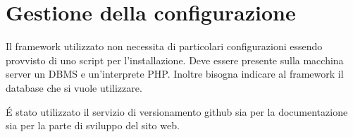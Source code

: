 \documentclass[a4paper,12pt,hidelinks]{report}
\begin{document}
\section{Gestione della configurazione}
Il framework utilizzato non necessita di particolari configurazioni essendo provvisto di uno script per l'installazione. Deve essere presente sulla macchina server un 
DBMS e un'interprete PHP. Inoltre bisogna indicare al framework il database che si vuole utilizzare.
\par \'E stato utilizzato il servizio di versionamento github sia per la documentazione sia per la parte di sviluppo del sito web.
\end{document}
